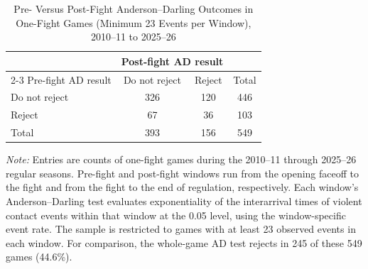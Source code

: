 \begin{table}[htbp]
\centering
\caption{Pre- Versus Post-Fight Anderson--Darling Outcomes in One-Fight Games (Minimum 23 Events per Window), 2010--11 to 2025--26}
\label{tab:one_fight_AD_rejection_min_23_20102011_20252026}
\small
\renewcommand{\arraystretch}{1.15}
\setlength{\tabcolsep}{6pt}

\begin{tabular*}{0.78\textwidth}{@{\extracolsep{\fill}}lccc}
\toprule
 & \multicolumn{2}{c}{Post-fight AD result} & \\
\cmidrule(lr){2-3}
Pre-fight AD result & Do not reject & Reject & Total \\
\midrule
Do not reject & 326 & 120 & 446 \\
Reject & 67 & 36 & 103 \\
\midrule
Total & 393 & 156 & 549 \\
\bottomrule
\end{tabular*}

\vspace{0.4em}
\parbox{0.78\textwidth}{
\footnotesize
\textit{Note:} Entries are counts of one-fight games during the 2010--11 through 2025--26 regular seasons. Pre-fight and post-fight windows run from the opening faceoff to the fight and from the fight to the end of regulation, respectively. Each window's Anderson--Darling test evaluates exponentiality of the interarrival times of violent contact events within that window at the 0.05 level, using the window-specific event rate. The sample is restricted to games with at least 23 observed events in each window. For comparison, the whole-game AD test rejects in 245 of these 549 games (44.6\%).
}
\end{table}
